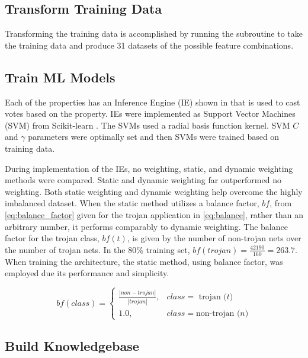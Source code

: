 \subsection{Transform Training Data}

Transforming the training data is accomplished by running the subroutine to take
the training data and produce 31 datasets of the possible feature combinations.

\subsection{Train ML Models}

Each of the properties has an Inference Engine (IE) shown in that is used to
cast votes based on the property. IEs were implemented as Support Vector
Machines (SVM) from Scikit-learn \cite{scikitlearn}. The SVMs used a radial
basis function kernel. SVM $C$ and $\gamma$ parameters were optimally set and
then SVMs were trained based on training data.

During implementation of the IEs, no weighting, static, and dynamic weighting
methods were compared.  Static and dynamic weighting far outperformed no
weighting. Both static weighting and dynamic weighting help overcome the highly
imbalanced dataset.  When the static method utilizes a balance factor, $bf$,
from \ref{eq:balance_factor} given for the trojan application in
\ref{eq:balance}, rather than an arbitrary number, it performs comparably to
dynamic weighting.  The balance factor for the trojan class, $bf(t)$, is given
by the number of non-trojan nets over the number of trojan nets.  In the 80\%
training set, $bf(trojan)=\frac{42190}{160}=263.7$.  When training the
architecture, the static method, using balance factor, was employed due its
performance and simplicity.


\sqsupseteq \begin{equation}\label{eq:balance}
    bf(class) =
    \begin{cases}
        \frac{|non-trojan|}{|trojan|},& class = \text{ trojan ($t$)} \\
        1.0,& class = \text{non-trojan ($n$)}
    \end{cases}
\end{equation}

\subsection{Build Knowledgebase}

